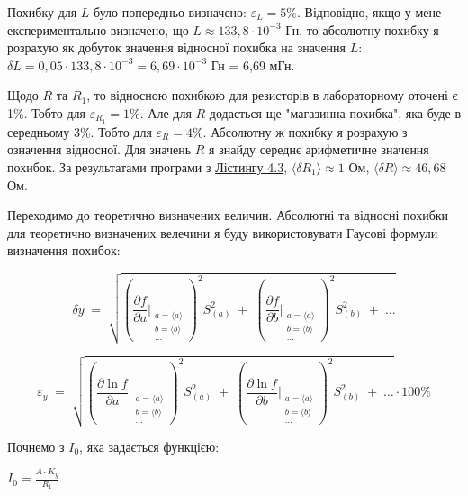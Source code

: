\documentclass[12pt,a4paper]{article}
\begin{document}
    Похибку для $L$ було попередньо визначено: $\varepsilon_L = 5\%$. Відповідно, якщо у мене експериментально визначено, що $L \approx 133,8 \cdot 10^{-3}$ Гн,
    то абсолютну похибку я розрахую як добуток значення відносної похибка на значення $L$: $\delta L = 0,05 \cdot 133,8 \cdot 10^{-3} = 6,69 \cdot 10^{-3}$ Гн = 6,69 мГн.

    Щодо $R$ та $R_1$, то відносною похибкою для резисторів в лабораторному оточені є 1\%. Тобто для $\varepsilon_{R_1} = 1\%$. Але для $R$ додається ще "магазинна похибка", 
    яка буде в середньому 3\%. Тобто для $\varepsilon_R = 4\%$. Абсолютну ж похибку я розрахую з означення відносної. Для значень $R$ я знайду середнє арифметичне значення похибок.
    За результатами програми з \hyperlink{listing3}{Лістингу 4.3}, $\text{⟨}\delta R_1\text{⟩} \approx 1$ Ом, $\text{⟨}\delta R\text{⟩} \approx 46,68$ Ом.

    Переходимо до теоретично визначених величин. Абсолютні та відносні похибки для теоретично визначених велечини я буду використовувати Гаусові формули визначення похибок:

    \[
        \delta y \;=\;
        \sqrt{
        \left(
            \frac{\partial f}{\partial a}\Bigg|_{\substack{a=\langle a\rangle \\ b=\langle b\rangle \\ \dots}}
        \right)^{2} S_{(a)}^{2}
        \;+\;
        \left(
            \frac{\partial f}{\partial b}\Bigg|_{\substack{a=\langle a\rangle \\ b=\langle b\rangle \\ \dots}}
        \right)^{2} S_{(b)}^{2}
        \;+\;\dots
        }
    \]

    \[
        \varepsilon_y \;=\;
        \sqrt{
        \left(
            \frac{\partial \ln f}{\partial a}\Bigg|_{\substack{a=\langle a\rangle \\ b=\langle b\rangle \\ \dots}}
        \right)^{2} S_{(a)}^{2}
        \;+\;
        \left(
            \frac{\partial \ln f}{\partial b}\Bigg|_{\substack{a=\langle a\rangle \\ b=\langle b\rangle \\ \dots}}
        \right)^{2} S_{(b)}^{2}
        \;+\;\dots
        } \cdot 100 \%
    \]
    
    Почнемо з $I_0$, яка задається функцією:

    \begin{center}
        $\displaystyle I_0 = \frac{A \cdot K_y}{R_1}$
    \end{center}
\end{document}
